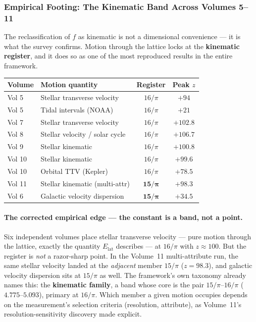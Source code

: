 \documentclass[12pt,oneside]{book}
\begin{document}
\subsubsection{Empirical Footing: The Kinematic Band Across Volumes 5--11}
 
The reclassification of $f$ as kinematic is not a dimensional convenience --- it is what
the survey confirms. Motion through the lattice locks at the \textbf{kinematic register},
and it does so as one of the most reproduced results in the entire framework.
 
\begin{center}
\setlength{\arrayrulewidth}{0.3mm}
\begin{tabular}{|l|l|c|c|}
\hline
\rowcolor{kishblue!12}
\textbf{Volume} & \textbf{Motion quantity} & \textbf{Register} & \textbf{Peak $z$} \\
\hline
Vol 5  & Stellar transverse velocity  & $16/\pi$ & $+94$ \\
Vol 5  & Tidal intervals (NOAA)       & $16/\pi$ & $+21$ \\
Vol 7  & Stellar transverse velocity  & $16/\pi$ & $+102.8$ \\
Vol 8  & Stellar velocity / solar cycle & $16/\pi$ & $+106.7$ \\
Vol 9  & Stellar kinematic            & $16/\pi$ & $+100.8$ \\
Vol 10 & Stellar kinematic            & $16/\pi$ & $+99.6$ \\
Vol 10 & Orbital TTV (Kepler)         & $16/\pi$ & $+78.5$ \\
Vol 11 & Stellar kinematic (multi-attr) & $\mathbf{15/\pi}$ & $+98.3$ \\
Vol 6  & Galactic velocity dispersion & $\mathbf{15/\pi}$ & $+34.5$ \\
\hline
\end{tabular}
\end{center}
 
\paragraph{The corrected empirical edge --- the constant is a band, not a point.}
Six independent volumes place stellar transverse velocity --- pure motion through the
lattice, exactly the quantity $E_{\mathrm{lat}}$ describes --- at $16/\pi$ with
$z \approx 100$. But the register is \emph{not} a razor-sharp point. In the Volume~11
multi-attribute run, the same stellar velocity landed at the \emph{adjacent} member
$15/\pi$ ($z = 98.3$), and galactic velocity dispersion sits at $15/\pi$ as well. The
framework's own taxonomy already names this: the \textbf{kinematic family}, a band whose
core is the pair $15/\pi$--$16/\pi$ ($4.775$--$5.093$), primary at $16/\pi$. Which member
a given motion occupies depends on the measurement's selection criteria (resolution,
attribute), as Volume~11's resolution-sensitivity discovery made explicit.
 
\end{document}
